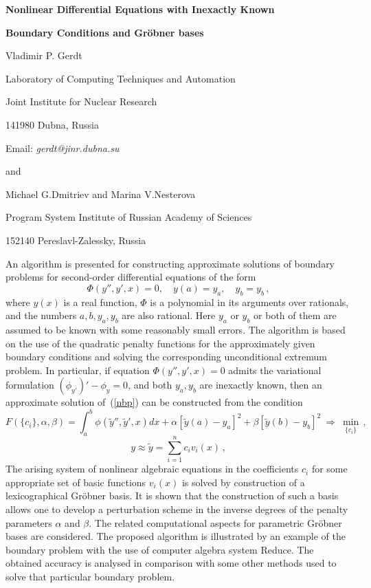 

\centerline{\bf Nonlinear Differential Equations with Inexactly Known}
\centerline{\bf Boundary Conditions and Gr\"{o}bner bases}

\vskip 0.3cm

\centerline{Vladimir P. Gerdt}
\centerline{Laboratory of Computing Techniques and Automation}
\centerline{Joint Institute for Nuclear Research}
\centerline{141980 Dubna, Russia}
\centerline{Email: {\em gerdt@jinr.dubna.su}}
\centerline{and}
\centerline{Michael G.Dmitriev and Marina V.Nesterova}
\centerline{Program System Institute of Russian Academy of Sciences}
\centerline{152140 Pereslavl-Zalessky, Russia}

\vskip 0.3cm

An algorithm is presented for constructing approximate solutions of boundary
problems for second-order differential equations of the form
\begin{equation}
\Phi(y'',y',x)=0, \quad y(a)=y_a,\quad y_b=y_b\,, \label{nbp}
\end{equation}
where $y(x)$ is a real function, $\Phi$ is a
polynomial in its arguments over rationals, and the numbers $a,b,y_a,y_b$
are also rational. Here $y_a$ or $y_b$ or both of them are assumed to be
known with some reasonably small errors. The algorithm is based on the use
of the quadratic penalty functions for the approximately given boundary
conditions and solving the corresponding unconditional extremum problem.
In particular, if equation $\Phi(y'',y',x)=0$ admits the variational
formulation $(\phi_{y'})'-\phi_{y}=0$, and both $y_a,y_b$ are inexactly
known, then an approximate solution of~(\ref{nbp}) can be constructed
from the condition
$$
F(\{c_i\},\alpha,\beta)=\int_a^b \phi(\tilde{y}'',\tilde{y}',x)dx +
 \alpha[\tilde{y}(a)-y_a]^2 + \beta[\tilde{y}(b)-y_b]^2
 \ \Longrightarrow \ \min_{\{c_i\}}\,,
$$
$$
 y\approx \tilde{y}=\sum_{i=1}^n c_i v_i(x)\,,
$$
The arising system of nonlinear algebraic equations in the coefficients
$c_i$ for some appropriate set of basic functions $v_i(x)$ is solved by
construction of a lexicographical Gr\"{o}bner basis. It is shown that the
construction of such a basis allows one to develop a perturbation scheme
in the inverse degrees of the penalty parameters $\alpha$ and $\beta$.
The related computational aspects for parametric Gr\"{o}bner bases are
considered. The proposed algorithm is illustrated by an example of the
boundary problem with the use of computer algebra system Reduce. The
obtained accuracy is analysed in comparison with some other methods
used to solve that particular boundary problem.


